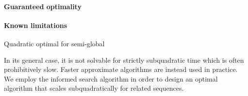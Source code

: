 \paragraph{Guaranteed optimality}

\paragraph{Known limitations}

Quadratic optimal for semi-global

In its general case, it is not solvable for strictly subquadratic time which is
often prohibitively slow. Faster approximate algorithms are instead used in
practice. We employ the \A informed search algorithm in order to design an
optimal algorithm that scales subquadratically for related sequences.